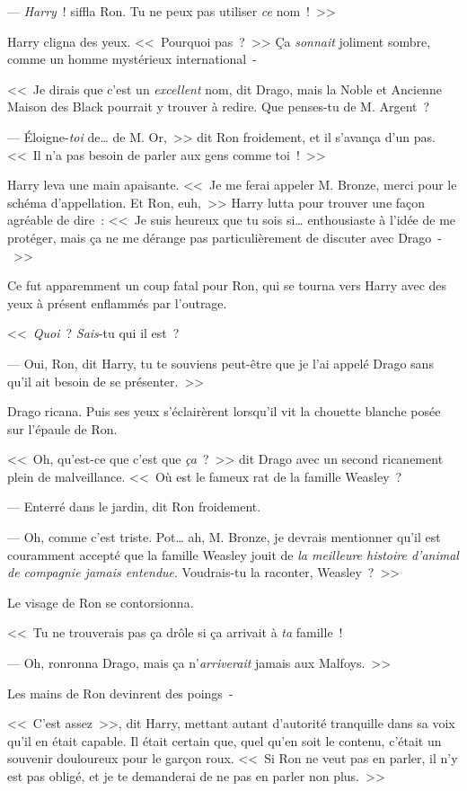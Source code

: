 --- \emph{Harry}~! siffla Ron. Tu ne peux pas utiliser \emph{ce} nom~!~>>

Harry cligna des yeux. <<~Pourquoi pas~?~>> Ça \emph{sonnait} joliment sombre, comme un homme mystérieux international~-

<<~Je dirais que c'est un \emph{excellent} nom, dit Drago, mais la Noble et Ancienne Maison des Black pourrait y trouver à redire. Que penses-tu de M. Argent~?

--- Éloigne-\emph{toi} de… de M. Or,~>> dit Ron froidement, et il s'avança d'un pas. <<~Il n'a pas besoin de parler aux gens comme toi~!~>>

Harry leva une main apaisante. <<~Je me ferai appeler M. Bronze, merci pour le schéma d'appellation. Et Ron, euh,~>> Harry lutta pour trouver une façon agréable de dire~: <<~Je suis heureux que tu sois si… enthousiaste à l'idée de me protéger, mais ça ne me dérange pas particulièrement de discuter avec Drago~-~>>

Ce fut apparemment un coup fatal pour Ron, qui se tourna vers Harry avec des yeux à présent enflammés par l'outrage.

<<~\emph{Quoi}~? \emph{Sais}-tu qui il est~?

--- Oui, Ron, dit Harry, tu te souviens peut-être que je l'ai appelé Drago sans qu'il ait besoin de se présenter.~>>

Drago ricana. Puis ses yeux s'éclairèrent lorsqu'il vit la chouette blanche posée sur l'épaule de Ron.

<<~Oh, qu'est-ce que c'est que \emph{ça}~?~>> dit Drago avec un second ricanement plein de malveillance. <<~Où est le fameux rat de la famille Weasley~?

--- Enterré dans le jardin, dit Ron froidement.

--- Oh, comme c'est triste. Pot… ah, M. Bronze, je devrais mentionner qu'il est couramment accepté que la famille Weasley jouit de \emph{la meilleure histoire d'animal de compagnie jamais entendue}. Voudrais-tu la raconter, Weasley~?~>>

Le visage de Ron se contorsionna.

<<~Tu ne trouverais pas ça drôle si ça arrivait à \emph{ta} famille~!

--- Oh, ronronna Drago, mais ça n'\emph{arriverait} jamais aux Malfoys.~>>

Les mains de Ron devinrent des poings~-

<<~C'est assez~>>, dit Harry, mettant autant d'autorité tranquille dans sa voix qu'il en était capable. Il était certain que, quel qu'en soit le contenu, c'était un souvenir douloureux pour le garçon roux. <<~Si Ron ne veut pas en parler, il n'y est pas obligé, et je te demanderai de ne pas en parler non plus.~>>

